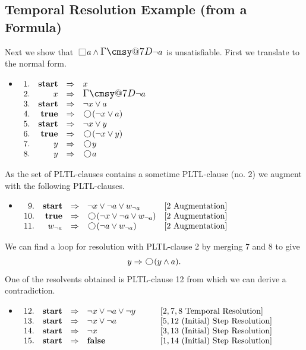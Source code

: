 \documentclass[nohyperref]{acmtrans2f}
\makeatletter
\def\sometime{\mathord{\hbox{\large$\mathchar"0\cmsy@7D$}}}
\newcommand{\always}{\raisebox{-.2ex}{
                           \mbox{\unitlength=0.9ex
                           \begin{picture}(2,2)
                           \linethickness{0.06ex}
                           \put(0,0){\line(1,0){2}}
                           \put(0,2){\line(1,0){2}}
                           \put(0,0){\line(0,1){2}}
                           \put(2,0){\line(0,1){2}}
                           \end{picture}}}
                          \,}
\newcommand{\next}{\!\raisebox{-.2ex}{ %
                        \mbox{\unitlength=0.9ex
                        \begin{picture}(2,2)
                        \linethickness{0.06ex}
                        \put(1,1){\circle{2}} %
                        \end{picture}}}       %
                        \,}
\let\imp=\Rightarrow
\def\ltrue{\hbox{\rm\bf true}}
\def\lfalse{\hbox{\rm\bf false}}
\def\lstart{\hbox{\rm\bf start}}
\makeatother
\begin{document}
\subsection{Temporal Resolution Example (from a Formula)}
Next we show that $\always a \land \sometime \neg a$ is
unsatisfiable. First we translate to the normal form.
\begin{itemize}
\item[] $\begin{array}[t]{rrcl}
1. & \lstart & \imp & x \\
2. & x & \imp & \sometime \neg a \\
3. & \lstart & \imp & \neg x \lor a \\
4. & \ltrue  & \imp & \next (\neg x \lor a) \\
5. & \lstart & \imp & \neg x \lor y \\
6. & \ltrue  & \imp & \next (\neg x \lor y) \\
7. & y & \imp & \next y \\
8. & y & \imp & \next a \\
\end{array}$
\end{itemize}
As the set of PLTL-clauses contains a sometime PLTL-clause (no. 2) we
augment with the following PLTL-clauses.
\begin{itemize}
\item[]$\begin{array}[t]{rrcll}
9.& \lstart & \imp & \neg x \lor \neg a \lor w_{\neg a} &
[2 \mbox{ Augmentation}] \\
10. & \ltrue & \imp & \next( \neg x \lor \neg a \lor w_{\neg a}) &
[2 \mbox{ Augmentation}]   \\
11. & w_{\neg a} & \imp & \next(\neg a \lor w_{\neg a}) &
[2 \mbox{ Augmentation}]   \\
\end{array}$
\end{itemize}
We can find a loop for resolution with PLTL-clause 2 by merging 7 and 8 to
give
$$ y \imp  \next (y \land a).$$
One of the resolvents obtained is PLTL-clause 12 from which we can derive a
contradiction. 
\begin{itemize}
\item[] $\begin{array}[t]{rrcll}
12. & \lstart & \imp & \neg x \lor \neg a \lor \neg y \qquad & [2,7,8 \mbox{ Temporal Resolution}]\\ 
13. & \lstart & \imp & \neg x \lor \neg a \qquad & [5,12 \mbox{ (Initial) Step Resolution}]\\ 
14. & \lstart & \imp & \neg x \qquad & [3,13 \mbox{ (Initial) Step Resolution}]\\ 
15. & \lstart & \imp & \lfalse \qquad & [1,14 \mbox{ (Initial) Step Resolution}]\\ 
\end{array}$
\end{itemize}
%
\end{document}
